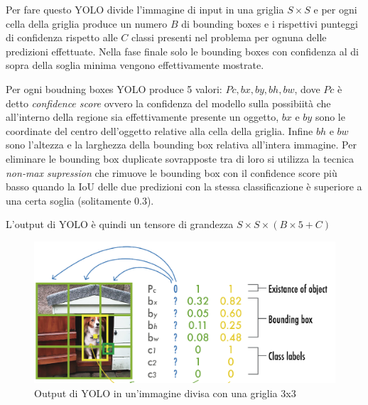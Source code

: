 \documentclass[12pt,a4paper,openright,twoside]{report}
\begin{document}
Per fare questo YOLO divide l'immagine di input in una griglia $S\times S$ e per ogni cella della griglia produce un numero $B$ di bounding boxes e i rispettivi punteggi di confidenza rispetto alle $C$ classi presenti nel problema per ognuna delle predizioni effettuate.
Nella fase finale solo le bounding boxes con confidenza al di sopra della soglia minima vengono effettivamente mostrate.

Per ogni boudning boxes YOLO produce 5 valori: $Pc,bx,by,bh,bw$, dove $Pc$ è detto \emph{confidence score} ovvero la confidenza del modello sulla possibiità che all'interno della regione sia effettivamente presente un oggetto, $bx$ e $by$ sono le coordinate del centro dell'oggetto relative alla cella della griglia. Infine $bh$ e $bw$ sono l'altezza e la larghezza della bounding box relativa all'intera immagine.
Per eliminare le bounding box duplicate sovrapposte tra di loro si utilizza la tecnica \emph{non-max supression} che rimuove le bounding box con il confidence score più basso quando la IoU delle due predizioni con la stessa classificazione è superiore a una certa soglia (solitamente 0.3). 

L'output di YOLO è quindi un tensore di grandezza $S \times S \times (B \times 5 + C)$
\begin{figure}[h]
\centering
\includegraphics[width=\linewidth]{yoloOUTPUT.png}
\caption{Output di YOLO in un'immagine divisa con una griglia 3x3}
\end{figure}
\end{document}
